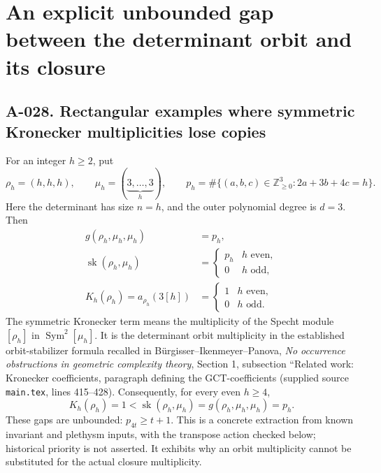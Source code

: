 \section{An explicit unbounded gap between the determinant orbit and its closure}

\subsection*{A-028. Rectangular examples where symmetric Kronecker multiplicities lose copies}
For an integer \(h\geq2\), put
\[
 \rho_h=(h,h,h),\qquad \mu_h=(\underbrace{3,\ldots,3}_{h}),\qquad
 p_h=\#\{(a,b,c)\in\mathbb Z_{\geq0}^3:2a+3b+4c=h\}.
\]
Here the determinant has size \(n=h\), and the outer polynomial
 degree is \(d=3\). Then
\begin{align}
 g(\rho_h,\mu_h,\mu_h)&=p_h,                         \tag{A-028.1}\\
 \operatorname{sk}(\rho_h,\mu_h)&=
 \begin{cases}p_h&h\text{ even},\\0&h\text{ odd},\end{cases}
                                                               \tag{A-028.2}\\
 K_h(\rho_h)=a_{\rho_h}(3[h])&=
 \begin{cases}1&h\text{ even},\\0&h\text{ odd}.\end{cases}
                                                               \tag{A-028.3}
\end{align}
The symmetric Kronecker term means the multiplicity of the Specht
module \([\rho_h]\) in \(\operatorname{Sym}^2[\mu_h]\).
It is the determinant orbit multiplicity in the established
orbit-stabilizer formula recalled in B\"urgisser--Ikenmeyer--Panova,
\emph{No occurrence obstructions in geometric complexity theory},
Section 1, subsection ``Related work: Kronecker coefficients,
paragraph defining the GCT-coefficients (supplied source
\texttt{main.tex}, lines 415--428). Consequently, for every
even \(h\geq4\),
\[
 K_h(\rho_h)=1<\operatorname{sk}(\rho_h,\mu_h)
                       =g(\rho_h,\mu_h,\mu_h)=p_h.              \tag{A-028.4}
\]
These gaps are unbounded: \(p_{4t}\geq t+1\).
This is a concrete extraction from known invariant and plethysm
inputs, with the transpose action checked below; historical priority
is not asserted. It exhibits why an orbit multiplicity cannot be
substituted for the actual closure multiplicity.

